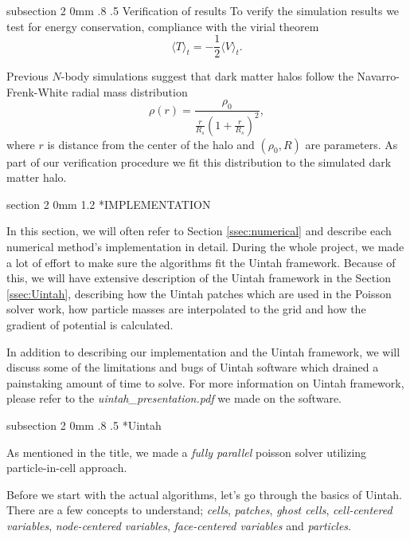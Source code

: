 \documentclass[notitlepage, 12pt]{article}
\makeatletter
\renewcommand{\section}{\@startsection       %
        {section}
        {2}
        {0mm}
        {1.2\baselineskip}
        {\baselineskip}
        {\centering\normalsize}}
\renewcommand{\subsection}{\@startsection    %
        {subsection}
        {2}
        {0mm}
        {.8\baselineskip}
        {.5\baselineskip}
        {\bfseries\normalsize}}
\makeatother
\begin{document}
\subsection{Verification of results}
To verify the simulation results we test for energy conservation, compliance with the virial theorem 
\begin{equation}
\langle T \rangle_t = -\frac{1}{2}\langle V \rangle_t.
\end{equation}

Previous $N$-body simulations suggest that dark matter halos follow the Navarro-Frenk-White radial mass distribution 
\begin{equation}
\rho(r) = \frac{\rho_0}{\frac{r}{R_s}\left(1 + \frac{r}{R_s}\right)^2},
\end{equation}
where $r$ is distance from the center of the halo and $(\rho_0,R)$ are parameters. As part of our verification procedure we fit this distribution to the simulated dark matter halo.

\section*{IMPLEMENTATION}

In this section, we will often refer to Section \ref{ssec:numerical} and describe each numerical method's implementation in detail. During the whole 
project, we made a lot of effort to make sure the algorithms fit the Uintah framework. Because of this, we will have extensive description of 
the Uintah framework in the Section \ref{ssec:Uintah}, describing how the Uintah patches which are used in the Poisson solver work, 
how particle masses are interpolated to the grid and how the gradient of potential is calculated. 

In addition to describing our implementation and the Uintah framework, 
we will discuss some of the limitations and 
bugs of Uintah software which drained a painstaking amount of time to solve. For more information on Uintah framework, please refer to the \emph{uintah\_presentation.pdf} 
we made on the software.

\subsection*{Uintah} \label{ssec:Uintah}

As mentioned in the title, we made a \emph{fully parallel} poisson solver utilizing particle-in-cell approach.

Before we start with the actual algorithms, let's go through the basics of Uintah. There are a few concepts to understand; \emph{cells}, \emph{patches}, 
\emph{ghost cells}, \emph{cell-centered variables}, \emph{node-centered variables}, \emph{face-centered variables} and \emph{particles}. 
\end{document}
